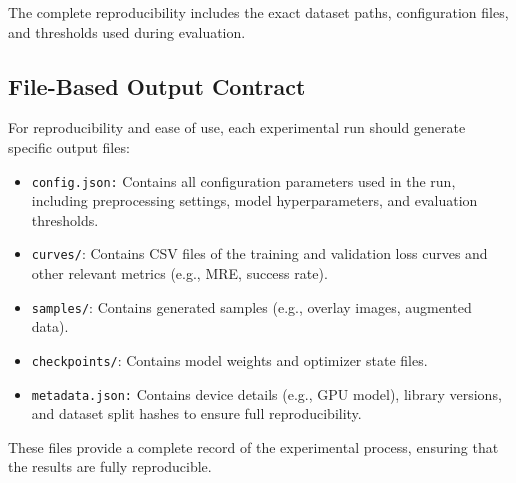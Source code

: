 The complete reproducibility includes the exact dataset paths, configuration files, and thresholds used during evaluation.

\subsection{File-Based Output Contract}
For reproducibility and ease of use, each experimental run should generate specific output files:
\begin{itemize}
  \item \texttt{config.json:} Contains all configuration parameters used in the run, including preprocessing settings, model hyperparameters, and evaluation thresholds.
  \item \texttt{curves/}: Contains CSV files of the training and validation loss curves and other relevant metrics (e.g., MRE, success rate).
  \item \texttt{samples/}: Contains generated samples (e.g., overlay images, augmented data).
  \item \texttt{checkpoints/}: Contains model weights and optimizer state files.
  \item \texttt{metadata.json:} Contains device details (e.g., GPU model), library versions, and dataset split hashes to ensure full reproducibility.
\end{itemize}
These files provide a complete record of the experimental process, ensuring that the results are fully reproducible.

